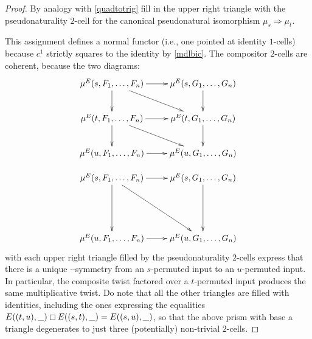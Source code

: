 {{{\begin{proof}
By analogy with \ref{quadtotrig} fill in the upper right triangle
with the pseudonaturality $2$-cell for the canonical pseudonatural
isomorphism $\mu_s\Rightarrow \mu_t$.

This assignment defines a normal functor (i.e., one pointed at 
identity $1$-cells) because $c^1_\cdot$ strictly squares to the identity
by \ref{mdlbic}. The compositor $2$-cells are coherent, because the
two diagrams:
\[\begin{array}{c}
\xymatrix{\mu^E(s,F_1,\ldots,F_n) \ar[r]\ar[d]\ar[dr] 
& \mu^E(s,G_1,\ldots,G_n) \ar[d]\\
\mu^E(t,F_1,\ldots,F_n) \ar[r]\ar[d]\ar[dr]&
\mu^E(t,G_1,\ldots,G_n) \ar[d]\\
\mu^E(u,F_1,\ldots,F_n) \ar[r]&
\mu^E(u,G_1,\ldots,G_n) }\\\\
\xymatrix{\mu^E(s,F_1,\ldots,F_n) \ar[r]\ar[dd]\ar[ddr] 
& \mu^E(s,G_1,\ldots,G_n) \ar[dd]\\\\
\mu^E(u,F_1,\ldots,F_n) \ar[r]&
\mu^E(u,G_1,\ldots,G_n) }\end{array}\]
with each upper right triangle filled by the pseudonaturality $2$-cells
express that there is a unique $\cdot$-symmetry from an $s$-permuted
input to an $u$-permuted input. In particular, the composite twist 
factored over a $t$-permuted input produces the same multiplicative
twist. Do note that all the other triangles are filled with identities,
including the ones expressing the equalities 
$E((t,u),\_)\boxempty E((s,t),\_)=E((s,u),\_)$, so that the above prism
with base a triangle degenerates to just three (potentially) 
non-trivial $2$-cells.\end{proof}}}

{}

}
